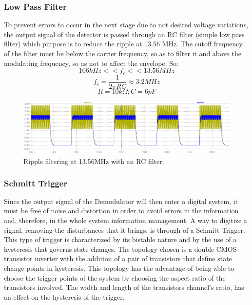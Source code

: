 \documentclass{article} %
\begin{document}
\begin{multicols}{2}
\subsubsection{Low Pass Filter}
To prevent errors to occur in the next stage due to not desired voltage variations, the output signal of the detector is passed through an RC filter (simple low pass filter) which purpose is to reduce the ripple at 13.56 MHz. The cutoff frequency of the filter must be below the carrier frequency, so as to filter it and above the modulating frequency, so as not to affect the envelope. So:
$$106kHz<<f_c<<13.56MHz$$
$$f_c = \frac{1}{2\pi RC} \approx 3.2MHz$$
$$R = 10 k\Omega ; C = 6 pF$$

\begin{figure}[H]
\centering
\includegraphics[scale=0.2]{Images/ImagenesTesina/Antecedentes/Sim_RC.png}
\caption{Ripple filtering at 13.56MHz with an RC filter.}
\label{fig:Sim_RC}
\end{figure}

\subsubsection{Schmitt Trigger}
Since the output signal of the Demodulator will then enter a digital system, it must be free of noise and distortion in order to avoid errors in the information and, therefore, in the whole system information management. A way to digitize a signal, removing the disturbances that it brings, is through of a Schmitt Trigger. This type of trigger is characterized by its bistable nature and by the use of a hysteresis that governs state changes. The topology chosen is a double CMOS transistor inverter with the addition of a pair of transistors that define state change points in hysteresis. This topology has the advantage of being able to choose the trigger points of the system by choosing the aspect ratio of the transistors involved. The width and length of the transistors channel’s ratio, has an effect on the hysteresis of the trigger.


\end{multicols}
\end{document}
